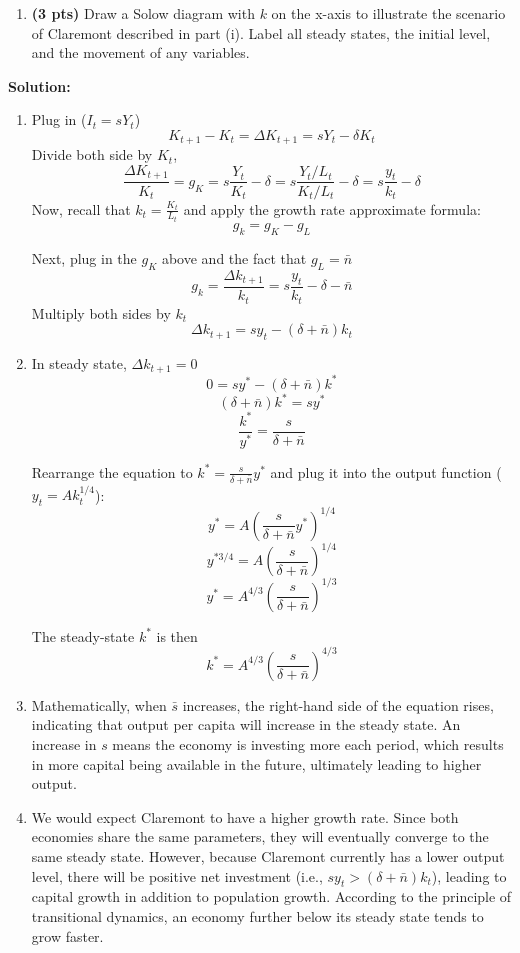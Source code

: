 \documentclass[14pt, oneside]{memoir}
\begin{document}
\begin{enumerate}[label=\textbf{\arabic*.}, itemsep=15pt]
\begin{enumerate}[label=(\alph*)]
	\clearpage
	\item \textbf{(3 pts)} Draw a Solow diagram with \( k \) on the x-axis to illustrate the scenario of Claremont described in part (i). Label all steady states, the initial level, and the movement of any variables.
\end{enumerate}



\newpage
\textbf{Solution:}
\begin{enumerate}[label=(\alph*)]
	\item Plug in ($I_t = s Y_t$)
	\[K_{t+1}- K_t = \Delta K_{t+1}=  sY_t -\delta K_t\]
	Divide both side by $K_t$,
	\[\frac{\Delta K_{t+1}}{K_t} = g_K  = s\frac{Y_t }{K_t}-\delta = s\frac{Y_t/L_t }{K_t/L_t}-\delta = s\frac{y_t }{k_t}-\delta\]
	Now, recall that $k_t = \frac{K_t}{L_t}$ and apply the growth rate approximate formula:
	\[g_k = g_K - g_L\]
	
	Next, plug in the $g_K$ above and the fact that $g_L = \bar{n}$
	\[g_k= \frac{\Delta k_{t+1}}{k_t} = s\frac{y_t }{k_t}-\delta - \bar{n}\]
	Multiply both sides by $k_t$
	\[\Delta k_{t+1} = sy_t- (\delta + \bar{n})k_t\]
	\item 
	In steady state, $\Delta k_{t+1} = 0$
	\[0 = sy^*- (\delta + \bar{n})k^*\]
	\[(\delta + \bar{n})k^* = sy^* \]
	\[\frac{k^*}{y^*} = \frac{s}{\delta + \bar{n}} \]
	
	\clearpage
	Rearrange the equation to $k^* = \frac{s}{\delta + \bar{n}} y^*$ and plug it into the output function ($y_t = Ak^{1/4}_t$):
	\[y^* = A \left(\frac{s}{\delta + \bar{n}} y^*\right)^{1/4}\]
	\[y^{* 3/4} = A \left(\frac{s}{\delta + \bar{n}} \right)^{1/4}\]
	\[y^{*} = A^{4/3} \left(\frac{s}{\delta + \bar{n}} \right)^{1/3}\]

	
	The steady-state $k^*$ is then
	\[k^* =  A^{4/3}  \left(\frac{s}{\delta + \bar{n}} \right)^{4/3}\]
	
	\item Mathematically, when \(\bar{s}\) increases, the right-hand side of the equation rises, indicating that output per capita will increase in the steady state. An increase in \(s\) means the economy is investing more each period, which results in more capital being available in the future, ultimately leading to higher output.
	
	\item We would expect Claremont to have a higher growth rate. Since both economies share the same parameters, they will eventually converge to the same steady state. However, because Claremont currently has a lower output level, there will be positive net investment (i.e., \(sy_t > (\delta + \bar{n}) k_t\)), leading to capital growth in addition to population growth. According to the principle of transitional dynamics, an economy further below its steady state tends to grow faster.
	

\end{enumerate}
\end{enumerate}
\end{document}
